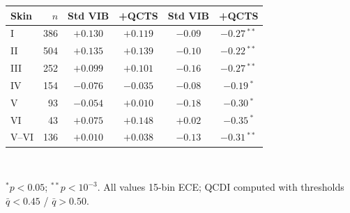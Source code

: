 \begin{table}[!t]
\begin{minipage}[t]{0.50\linewidth}
\begin{tabular}{lrcccc}
Skin & $n$ & Std VIB & +QCTS & Std VIB & +QCTS \\
\midrule
I    & 386 & $+0.130$ & $+0.119$ & $-0.09$ & $-0.27$\,$^{**}$ \\
II   & 504 & $+0.135$ & $+0.139$ & $-0.10$ & $-0.22$\,$^{**}$ \\
III  & 252 & $+0.099$ & $+0.101$ & $-0.16$ & $-0.27$\,$^{**}$ \\
IV   & 154 & $-0.076$ & $-0.035$ & $-0.08$ & $-0.19$\,$^*$ \\
V    &  93 & $-0.054$ & $\mathbf{+0.010}$ & $-0.18$ & $\mathbf{-0.30}$\,$^*$ \\
VI   &  43 & $+0.075$ & $+0.148$ & $+0.02$ & $\mathbf{-0.35}$\,$^*$ \\
\midrule
V--VI & 136 & $+0.010$ & $+0.038$ & $-0.13$ & $\mathbf{-0.31}$\,$^{**}$ \\
\bottomrule
\end{tabular}
\vspace{2pt}\\
\scriptsize\raggedright$^*$$p<0.05$; $^{**}$$p<10^{-3}$. All values 15-bin ECE; QCDI computed with thresholds $\bar q<0.45$ / $\bar q>0.50$.
\end{minipage}
\end{table}
